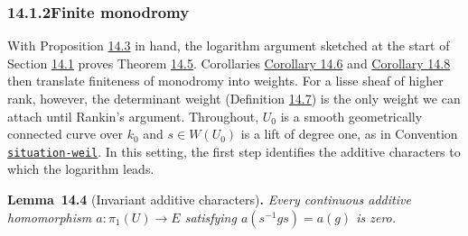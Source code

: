 \documentclass[11pt]{article}
\newenvironment{bpstatement}[2]{\par\addvspace{0.6\baselineskip}\noindent\textbf{#1}#2\textbf{.}\enspace\ignorespaces}
  {\par\addvspace{0.4\baselineskip}}
\newenvironment{bpstatementit}[2]{\begin{bpstatement}{#1}{#2}\itshape\ignorespaces}{\end{bpstatement}}
\newcommand{\bpslug}[1]{\texttt{#1}}
\begin{document}
\subsubsection*{\texorpdfstring{14.1.2\quad Finite monodromy}{14.1.2 Finite monodromy}}
\label{bp53}%
\label{bp54}%
With Proposition \hyperref[bp51]{14.3} in hand, the logarithm argument sketched at the start of Section \hyperref[bp41]{14.1} proves Theorem \hyperref[bp58]{14.5}. Corollaries \hyperref[bp61]{Corollary 14.6} and \hyperref[bp65]{Corollary 14.8} then translate finiteness of monodromy into weights. For a lisse sheaf of higher rank, however, the determinant weight (Definition \hyperref[bp64]{14.7}) is the only weight we can attach until Rankin's argument. Throughout, \(U_0\) is a smooth geometrically connected curve over \(k_0\) and \(s\in W(U_0)\) is a lift of degree one, as in Convention \hyperref[bp7]{\bpslug{situation-{}\allowbreak{}weil}}. In this setting, the first step identifies the additive characters to which the logarithm leads.

\label{bp55}%
\begin{bpstatementit}{Lemma~14.4}{ (Invariant additive characters)}
Every continuous additive homomorphism \(a:\pi_1(U)\to E\) satisfying \(a(s^{-1}gs)=a(g)\) is zero.
\end{bpstatementit}
\end{document}
